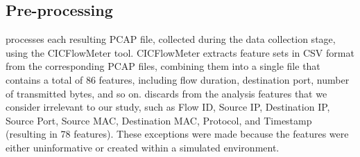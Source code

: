  
   
  



\subsection{Pre-processing}


\droidxpflow processes each resulting PCAP file, collected during the data collection stage, using the CICFlowMeter tool.
CICFlowMeter extracts feature sets in CSV format from the corresponding PCAP files, combining them into a single file that
contains a total of 86 features, including flow duration, destination port, number of transmitted bytes, and so on.
\droidxpflow discards from the analysis features that we consider irrelevant to our study, such as
Flow ID, Source IP, Destination IP, Source Port, Source MAC, Destination MAC, Protocol, and Timestamp
(resulting in 78 features). These exceptions were made because the features were either uninformative or created within a simulated environment.

